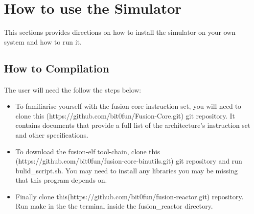 \documentclass[letterpaper, 11pt, twoside]{article}
\begin{document}
\cleardoublepage

\section[Simulator Usage]{How to use the Simulator}
\paragraph{}
\begin{flushleft}
	This sections provides directions on how to install the simulator on your own system and how to run it.
\end{flushleft}


\subsection[Compilation]{How to Compilation}
\paragraph{}
\begin{flushleft}
The user will need the follow the steps below:
	\begin{itemize}
		\item To familiarise yourself with the fusion-core instruction set, you will need to clone this (https://github.com/bit0fun/Fusion-Core.git) git repository. It contains documents that provide a full list of the architecture's instruction set and other specifications.
		\item To download the fusion-elf tool-chain, clone this (https://github.com/bit0fun/fusion-core-binutils.git) git repository and run bulid\_script.sh. You may need to install any libraries you may be missing that this program depends on.
		\item Finally clone this(https://github.com/bit0fun/fusion-reactor.git) repository. Run make in the the terminal inside the fusion\_reactor directory.
	\end{itemize}
	

\end{flushleft}

\end{document}
